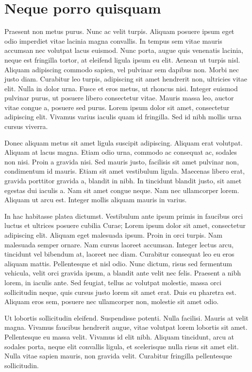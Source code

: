 \chapter{Neque porro quisquam}

Praesent non metus purus. Nunc ac velit turpis. Aliquam posuere ipsum eget odio imperdiet vitae lacinia magna convallis. In tempus sem vitae mauris accumsan nec volutpat lacus euismod. Nunc porta, augue quis venenatis lacinia, neque est fringilla tortor, at eleifend ligula ipsum eu elit. Aenean ut turpis nisl. Aliquam adipiscing commodo sapien, vel pulvinar sem dapibus non. Morbi nec justo diam. Curabitur leo turpis, adipiscing sit amet hendrerit non, ultricies vitae elit. Nulla in dolor urna. Fusce et eros metus, ut rhoncus nisi. Integer euismod pulvinar purus, ut posuere libero consectetur vitae. Mauris massa leo, auctor vitae congue a, posuere sed purus. Lorem ipsum dolor sit amet, consectetur adipiscing elit. Vivamus varius iaculis quam id fringilla. Sed id nibh mollis urna cursus viverra.

Donec aliquam metus sit amet ligula suscipit adipiscing. Aliquam erat volutpat. Aliquam at lacus magna. Etiam odio urna, commodo ac consequat ac, sodales non nisi. Proin a gravida nisi. Sed mauris justo, facilisis sit amet pulvinar non, condimentum id mauris. Etiam sit amet vestibulum ligula. Maecenas libero erat, gravida porttitor gravida a, blandit in nibh. In tincidunt blandit justo, sit amet egestas dui iaculis a. Nam sit amet congue neque. Nam nec ullamcorper lorem. Aliquam ut arcu est. Integer mollis aliquam mauris in varius.

In hac habitasse platea dictumst. Vestibulum ante ipsum primis in faucibus orci luctus et ultrices posuere cubilia Curae; Lorem ipsum dolor sit amet, consectetur adipiscing elit. Aliquam eget malesuada ipsum. Proin in orci turpis. Nam malesuada semper ornare. Nam cursus laoreet accumsan. Integer lectus arcu, tincidunt vel bibendum at, laoreet nec diam. Curabitur consequat leo eu eros aliquam mattis. Pellentesque et nisl odio. Nunc dictum, risus sed fermentum vehicula, velit orci gravida ipsum, a blandit ante velit nec felis. Praesent a nibh lorem, in iaculis ante. Sed feugiat, tellus ac volutpat molestie, massa orci sollicitudin neque, quis cursus justo lorem sit amet erat. Duis eu pharetra est. Aliquam eros sem, posuere nec ullamcorper non, molestie sit amet odio.

Ut lobortis sollicitudin eleifend. Suspendisse potenti. Nulla facilisi. Mauris at velit magna. Vivamus faucibus hendrerit augue, vitae volutpat lorem lobortis sit amet. Pellentesque eu massa velit. Vivamus id elit nibh. Aliquam tincidunt, arcu at sodales porta, neque elit convallis ligula, et scelerisque nulla risus sit amet elit. Nulla vitae sapien mauris, non gravida velit. Curabitur fringilla pellentesque sollicitudin.

